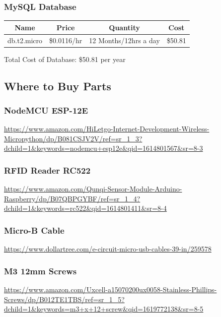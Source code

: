 \documentclass[12pt]{article}
\begin{document}
\begin{spacing}{1.2}
\subsubsection{MySQL Database}
\begin{center}
\begin{tabular}{ |c c c c| }

\hline
Name & Price & Quantity & Cost\\
\hline \hline
db.t2.micro & \$0.0116/hr & 12 Months/12hrs a day & \$50.81 \\
\hline
\end{tabular}
\end{center}

Total Cost of Database: \$50.81 per year

\subsection{Where to Buy Parts}

\subsubsection{NodeMCU ESP-12E}

\url{https://www.amazon.com/HiLetgo-Internet-Development-Wireless-Micropython/dp/B081CSJV2V/ref=sr_1_3?dchild=1&keywords=nodemcu+esp12e&qid=1614801567&sr=8-3}

\subsubsection{RFID Reader RC522}

\url{https://www.amazon.com/Qunqi-Sensor-Module-Arduino-Raspberry/dp/B07QBPGYBF/ref=sr_1_4?dchild=1&keywords=rc522&qid=1614801411&sr=8-4}

\subsubsection{Micro-B Cable}

\url{https://www.dollartree.com/e-circuit-micro-usb-cables-39-in/259578}

\subsubsection{M3 12mm Screws}

\url{https://www.amazon.com/Uxcell-a15070200ux0058-Stainless-Phillips-Screws/dp/B012TE1TBS/ref=sr_1_5?dchild=1&keywords=m3+x+12+screw&qid=1619772138&sr=8-5}


\end{spacing}
\end{document}
